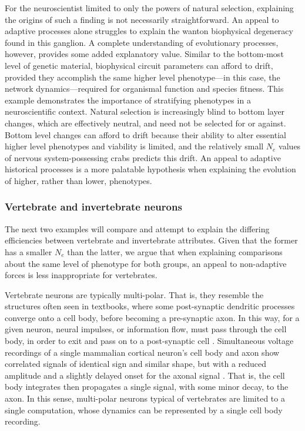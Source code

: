 \documentclass[twocolumn]{article}
\begin{document}
For the neuroscientist limited to only the powers of natural selection, explaining the origins of such a finding is not necessarily straightforward. An appeal to adaptive processes alone struggles to explain the wanton biophysical degeneracy found in this ganglion. A complete understanding of evolutionary processes, however, provides some added explanatory value. Similar to the bottom-most level of genetic material, biophysical circuit parameters can afford to drift, provided they accomplish the same higher level phenotype---in this case, the network dynamics---required for organismal function and species fitness. This example demonstrates the importance of stratifying phenotypes in a neuroscientific context. Natural selection is increasingly blind to bottom layer changes, which are effectively neutral, and need not be selected for or against. Bottom level changes can afford to drift because their ability to alter essential higher level phenotypes and viability is limited, and the relatively small $N_e$ values of nervous system-possessing crabs predicts this drift. An appeal to adaptive historical processes is a more palatable hypothesis when explaining the evolution of higher, rather than lower, phenotypes.

\subsubsection{Vertebrate and invertebrate neurons}

The next two examples will compare and attempt to explain the differing efficiencies between vertebrate and invertebrate attributes. Given that the former has a smaller $N_e$ than the latter, we argue that when explaining comparisons about the same level of phenotype for both groups, an appeal to non-adaptive forces is less inappropriate for vertebrates. 

Vertebrate neurons are typically multi-polar. That is, they resemble the structures often seen in textbooks, where some post-synaptic dendritic processes converge onto a cell body, before becoming a pre-synaptic axon. In this way, for a given neuron, neural impulses, or information flow, must pass through the cell body, in order to exit and pass on to a post-synaptic cell \cite{Goaillard_2020, kandel2013principles}. Simultaneous voltage recordings of a single mammalian cortical neuron's cell body and axon show correlated signals of identical sign and similar shape, but with a reduced amplitude and a slightly delayed onset for the axonal signal \cite{hu_bean_2018}. That is, the cell body integrates then propagates a single signal, with some minor decay, to the axon. In this sense, multi-polar neurons typical of vertebrates are limited to a single computation, whose dynamics can be represented by a single cell body recording. 
\end{document}
